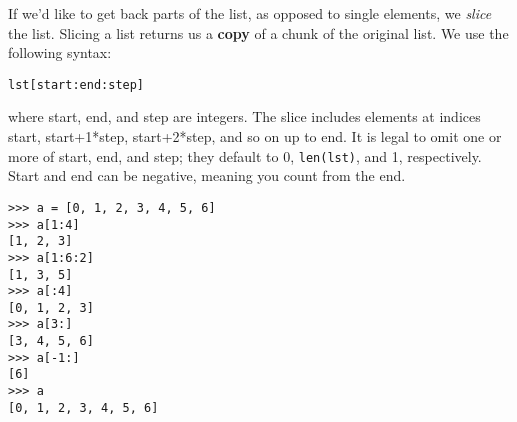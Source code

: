 If we'd like to get back parts of the list, as opposed to single elements, we
{\it slice} the list.  Slicing a list returns us a \textbf{copy} of a chunk of
the original list. We use the following syntax:\\

\centerline{\tt lst[start:end:step]}

where start, end, and step are integers. The slice includes elements at indices
start, start+1*step, start+2*step, and so on up to end. It is legal to omit one
or more of start, end, and step; they default to 0, {\tt len(lst)}, and 1,
respectively.  Start and end can be negative, meaning you count from the end.

\begin{lstlisting}
>>> a = [0, 1, 2, 3, 4, 5, 6]
>>> a[1:4]
[1, 2, 3]
>>> a[1:6:2]
[1, 3, 5]
>>> a[:4]
[0, 1, 2, 3]
>>> a[3:]
[3, 4, 5, 6]
>>> a[-1:]
[6]
>>> a
[0, 1, 2, 3, 4, 5, 6]
\end{lstlisting}

